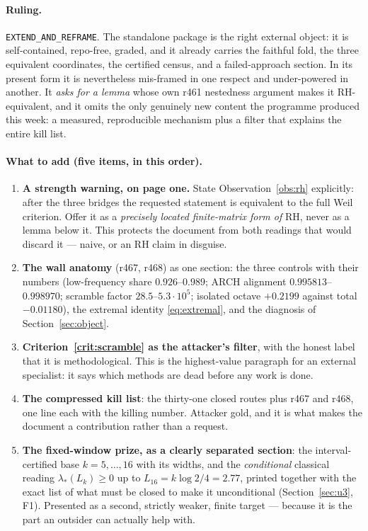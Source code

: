 \documentclass[11pt]{article}
\theoremstyle{remark}
\begin{document}
\paragraph{Ruling.}
\texttt{EXTEND\_AND\_REFRAME}.  The standalone package
 is the right external object: it
is self-contained, repo-free, graded, and it already carries the
faithful fold, the three equivalent coordinates, the certified
census, and a failed-approach section.  In its present form it is
nevertheless mis-framed in one respect and under-powered in another.
It \emph{asks for a lemma} whose own r461 nestedness argument makes
it RH-equivalent, and it omits the only genuinely new content the
programme produced this week: a measured, reproducible mechanism plus
a filter that explains the entire kill list.

\paragraph{What to add (five items, in this order).}
\begin{enumerate}
\item \textbf{A strength warning, on page one.}  State
Observation~\ref{obs:rh} explicitly: after the three bridges the
requested statement is equivalent to the full Weil criterion.  Offer
it as a \emph{precisely located finite-matrix form of} RH, never as a
lemma below it.  This protects the document from both readings that
would discard it --- naive, or an RH claim in disguise.
\item \textbf{The wall anatomy} (r467, r468) as one section: the
three controls with their numbers (low-frequency share
$0.926$--$0.989$; ARCH alignment $0.995813$--$0.998970$; scramble
factor $28.5$--$5.3\cdot10^{5}$; isolated octave $+0.2199$ against
total $-0.01180$), the extremal identity \eqref{eq:extremal}, and the
diagnosis of Section~\ref{sec:object}.
\item \textbf{Criterion~\ref{crit:scramble} as the attacker's
filter}, with the honest label that it is methodological.  This is
the highest-value paragraph for an external specialist: it says which
methods are dead before any work is done.
\item \textbf{The compressed kill list}: the thirty-one closed
routes plus r467 and r468, one line each with the killing number.
Attacker gold, and it is what makes the document a contribution
rather than a request.
\item \textbf{The fixed-window prize, as a clearly separated
section}: the interval-certified base $k=5,\dots,16$ with its
widths, and the \emph{conditional} classical reading
$\lambda_*(L_k)\ge0$ up to $L_{16}=k\log2/4=2.77$, printed together
with the exact list of what must be closed to make it unconditional
(Section~\ref{sec:u3}, F1).  Presented as a second, strictly weaker,
finite target --- because it is the part an outsider can actually
help with.
\end{enumerate}
\end{document}
